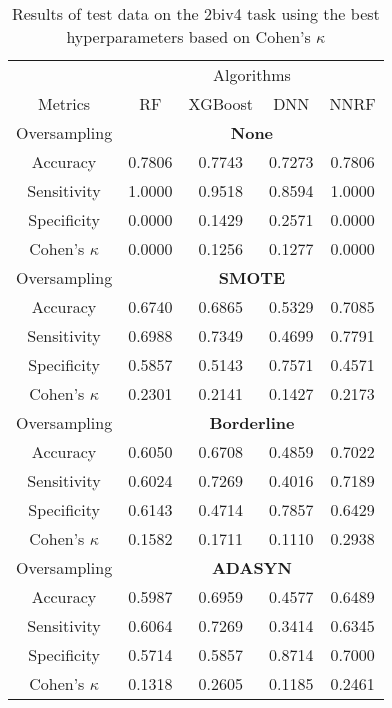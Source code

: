 \begin{table}[!htb]
\centering
\caption{Results of test data on the 2biv4 task using the best hyperparameters based on Cohen's $\kappa$}
\label{tab:2biv4_test_results}
\begin{tabular}{c | c c c c}
\hline
 & \multicolumn{4}{c}{Algorithms}\\ 
Metrics &RF & XGBoost & DNN & NNRF\\ 
\hline
Oversampling &\multicolumn{4}{|c}{\textbf{None}}\\ 
\hline
Accuracy & 0.7806 & 0.7743 & 0.7273 & 0.7806\\ 
Sensitivity & 1.0000 & 0.9518 & 0.8594 & 1.0000\\ 
Specificity & 0.0000 & 0.1429 & 0.2571 & 0.0000\\ 
Cohen's $\kappa$ & 0.0000 & 0.1256 & 0.1277 & 0.0000\\ 
\hline
Oversampling &\multicolumn{4}{|c}{\textbf{SMOTE}}\\ 
\hline
Accuracy & 0.6740 & 0.6865 & 0.5329 & 0.7085\\ 
Sensitivity & 0.6988 & 0.7349 & 0.4699 & 0.7791\\ 
Specificity & 0.5857 & 0.5143 & 0.7571 & 0.4571\\ 
Cohen's $\kappa$ & 0.2301 & 0.2141 & 0.1427 & 0.2173\\ 
\hline
Oversampling &\multicolumn{4}{|c}{\textbf{Borderline}}\\ 
\hline
Accuracy & 0.6050 & 0.6708 & 0.4859 & 0.7022\\ 
Sensitivity & 0.6024 & 0.7269 & 0.4016 & 0.7189\\ 
Specificity & 0.6143 & 0.4714 & 0.7857 & 0.6429\\ 
Cohen's $\kappa$ & 0.1582 & 0.1711 & 0.1110 & 0.2938\\ 
\hline
Oversampling &\multicolumn{4}{|c}{\textbf{ADASYN}}\\ 
\hline
Accuracy & 0.5987 & 0.6959 & 0.4577 & 0.6489\\ 
Sensitivity & 0.6064 & 0.7269 & 0.3414 & 0.6345\\ 
Specificity & 0.5714 & 0.5857 & 0.8714 & 0.7000\\ 
Cohen's $\kappa$ & 0.1318 & 0.2605 & 0.1185 & 0.2461\\ 
\hline
\end{tabular}
\end{table}


